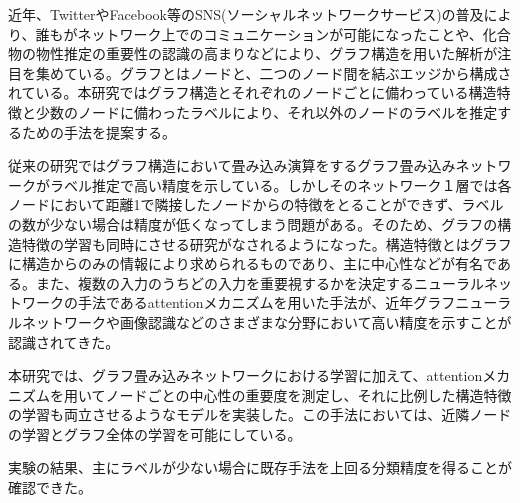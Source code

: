 近年、TwitterやFacebook等のSNS(ソーシャルネットワークサービス)の普及により、誰もがネットワーク上でのコミュニケーションが可能になったことや、化合物の物性推定の重要性の認識の高まりなどにより、グラフ構造を用いた解析が注目を集めている。グラフとはノードと、二つのノード間を結ぶエッジから構成されている。本研究ではグラフ構造とそれぞれのノードごとに備わっている構造特徴と少数のノードに備わったラベルにより、それ以外のノードのラベルを推定するための手法を提案する。

従来の研究ではグラフ構造において畳み込み演算をするグラフ畳み込みネットワークがラベル推定で高い精度を示している。しかしそのネットワーク１層では各ノードにおいて距離1で隣接したノードからの特徴をとることができず、ラベルの数が少ない場合は精度が低くなってしまう問題がある。そのため、グラフの構造特徴の学習も同時にさせる研究がなされるようになった。構造特徴とはグラフに構造からのみの情報により求められるものであり、主に中心性などが有名である。また、複数の入力のうちどの入力を重要視するかを決定するニューラルネットワークの手法であるattentionメカニズムを用いた手法が、近年グラフニューラルネットワークや画像認識などのさまざまな分野において高い精度を示すことが認識されてきた。

本研究では、グラフ畳み込みネットワークにおける学習に加えて、attentionメカニズムを用いてノードごとの中心性の重要度を測定し、それに比例した構造特徴の学習も両立させるようなモデルを実装した。この手法においては、近隣ノードの学習とグラフ全体の学習を可能にしている。

実験の結果、主にラベルが少ない場合に既存手法を上回る分類精度を得ることが確認できた。
